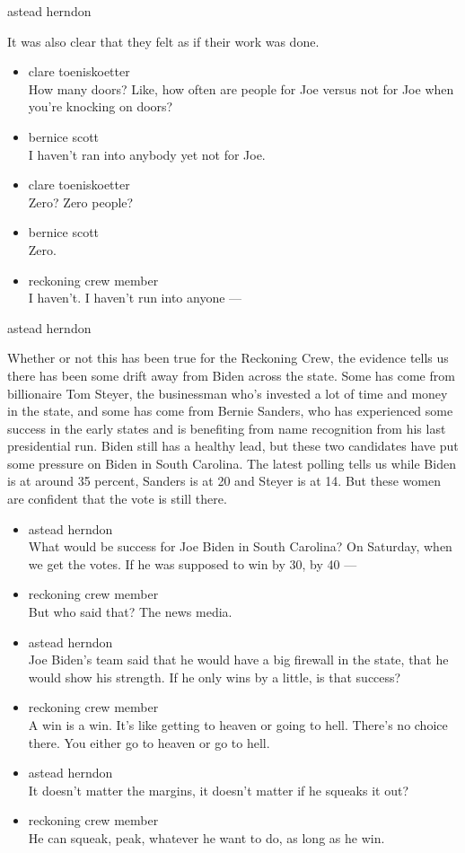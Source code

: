 astead herndon

It was also clear that they felt as if their work was done.

\begin{itemize}
\item
  clare toeniskoetter\\
  How many doors? Like, how often are people for Joe versus not for Joe
  when you're knocking on doors?
\item
  bernice scott\\
  I haven't ran into anybody yet not for Joe.
\item
  clare toeniskoetter\\
  Zero? Zero people?
\item
  bernice scott\\
  Zero.
\item
  reckoning crew member\\
  I haven't. I haven't run into anyone ---
\end{itemize}

astead herndon

Whether or not this has been true for the Reckoning Crew, the evidence
tells us there has been some drift away from Biden across the state.
Some has come from billionaire Tom Steyer, the businessman who's
invested a lot of time and money in the state, and some has come from
Bernie Sanders, who has experienced some success in the early states and
is benefiting from name recognition from his last presidential run.
Biden still has a healthy lead, but these two candidates have put some
pressure on Biden in South Carolina. The latest polling tells us while
Biden is at around 35 percent, Sanders is at 20 and Steyer is at 14. But
these women are confident that the vote is still there.

\begin{itemize}
\item
  astead herndon\\
  What would be success for Joe Biden in South Carolina? On Saturday,
  when we get the votes. If he was supposed to win by 30, by 40 ---
\item
  reckoning crew member\\
  But who said that? The news media.
\item
  astead herndon\\
  Joe Biden's team said that he would have a big firewall in the state,
  that he would show his strength. If he only wins by a little, is that
  success?
\item
  reckoning crew member\\
  A win is a win. It's like getting to heaven or going to hell. There's
  no choice there. You either go to heaven or go to hell.
\item
  astead herndon\\
  It doesn't matter the margins, it doesn't matter if he squeaks it out?
\item
  reckoning crew member\\
  He can squeak, peak, whatever he want to do, as long as he win.
\end{itemize}

